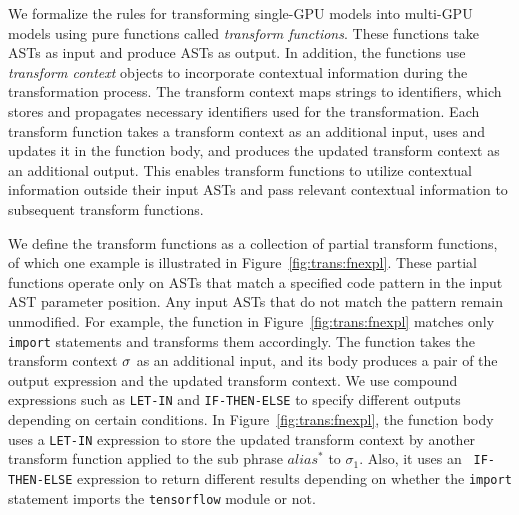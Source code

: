 \noindent
We formalize the rules for transforming single-GPU models into multi-GPU
models using pure functions called {\it transform functions}. 
These functions take ASTs as input and produce ASTs as output. 
In addition, the functions use {\it transform context} objects to incorporate
contextual information during the transformation process. 
The transform context maps strings to identifiers, which stores and
propagates necessary identifiers used for the transformation.
Each transform function takes a transform context as an additional input, uses
and updates it in the function body, and produces the updated transform context
as an additional output.
This enables transform functions to utilize contextual information outside
their input ASTs and pass relevant contextual information to subsequent
transform functions.

We define the transform functions as a collection of partial transform
functions, of which one example is illustrated in
Figure~\ref{fig:trans:fnexpl}. 
These partial functions operate only on ASTs that match a specified code
pattern in the input AST parameter position. 
Any input ASTs that do not match the pattern remain unmodified. 
For example, the function in Figure~\ref{fig:trans:fnexpl} matches only {\tt
import} statements and transforms them accordingly. 
The function takes the transform context $\sigma$ as an additional input, and
its body produces a pair of the output expression and the updated transform
context. 
We use compound expressions such as {\tt LET-IN} and {\tt IF-THEN-ELSE} to
specify different outputs depending on certain conditions. 
In Figure~\ref{fig:trans:fnexpl}, the function body uses a {\tt LET-IN}
expression to store the updated transform context by another transform function
applied to the sub phrase $alias^*$ to $\sigma_1$. 
Also, it uses an {\tt
IF-THEN-ELSE} expression to return different results depending on whether the
{\tt import} statement imports the {\tt tensorflow} module or not.

